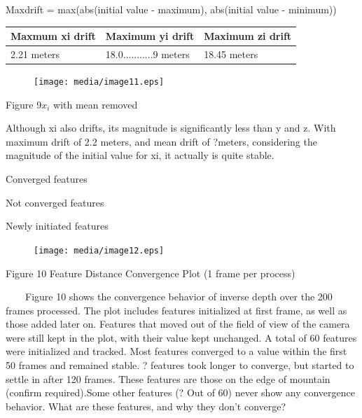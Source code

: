Maxdrift = max(abs(initial value - maximum), abs(initial value - 
minimum)) 

\begin{table}[h]
\centering
\begin{tabular}{|l|l|l|}
\hline
Maxmum xi drift & Maximum yi drift & Maximum zi drift \\
\hline
2.21 meters & 18.0...........9 meters & 18.45 meters \\
\hline
\end{tabular}
\end{table}


\begin{figure}[h]
\centering
\texttt{[image: media/image11.eps]}
\end{figure}


\begin{center}Figure 9$x_{i}$ with mean removed\end{center}

Although xi also drifts, its magnitude is significantly less than y and 
z. With maximum drift of 2.2 meters, and mean drift of ?meters, 
considering the magnitude of the initial value for xi, it actually is 
quite stable. 

Converged features

Not converged features

Newly initiated features

\begin{figure}[h]
\centering
\texttt{[image: media/image12.eps]}
\end{figure}


\begin{center}Figure 10 Feature Distance Convergence Plot (1 frame per 
process)\end{center}

\ \ \ \ Figure 10 shows the convergence behavior of inverse depth over 
the 200 frames processed. The plot includes features initialized at 
first frame, as well as those added later on. Features that moved out of 
the field of view of the camera were still kept in the plot, with their 
value kept unchanged. A total of 60 features were initialized and 
tracked. Most features converged to a value within the first 50 frames 
and remained stable. ? features took longer to converge, but started to 
settle in after 120 frames. These features are those on the edge of 
mountain (confirm required).Some other features (? Out of 60) never show 
any convergence behavior. What are these features, and why they don't 
converge?

